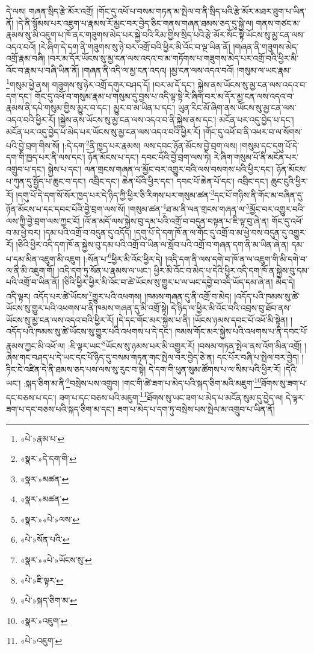 དེ་ལས། གཞན་སྲིད་རྩེ་མོར་འགྲོ། །གོང་དུ་འཕོ་པ་བསམ་གཏན་མ་སྤེལ་བ་ནི་སྲིད་པའི་རྩེ་མོར་མཐར་ཐུག་པ་ཡིན་ནོ། །དེ་ནི་སྙོམས་པར་འཇུག་པ་རྣམས་རོ་མྱང་བར་བྱེད་ཅིང་གནས་གཞན་ཐམས་ཅད་དུ་སྐྱེ་ལ། གནས་གཙང་མ་རྣམས་སུ་མི་འཇུག་པ་ཁོ་ནར་གཟུགས་མེད་པར་སྐྱེ་བའི་རིམ་གྱིས་སྲིད་པའི་རྩེ་མོར་སོང་སྟེ་ཡོངས་སུ་མྱ་ངན་ལས་འདའ་བའོ། །རེ་ཞིག་དེ་དག་ནི་གཟུགས་སུ་ཉེ་བར་འགྲོ་བའི་ཕྱིར་མི་འོང་བ་ལྔ་ཡིན་ནོ། །གཞན་ནི་གཟུགས་མེད་འགྲོ་རྣམ་བཞི། །བར་མ་དོར་ཡོངས་སུ་མྱ་ངན་ལས་འདའ་བ་མ་གཏོགས་པ་གཟུགས་མེད་པར་འགྲོ་བའི་ཕྱིར་མི་འོང་བ་རྣམ་པ་བཞི་ཡིན་ནོ། །གཞན་ནི་འདི་ལ་མྱ་ངན་འདའ། །མྱ་ངན་ལས་འདའ་བའོ། །གསུམ་ལ་ཡང་རྣམ་\footnote{«པེ་»རྣམ་པ་}གསུམ་ཕྱེ་ནས། གཟུགས་སུ་ཉེར་འགྲོ་དགུར་བཤད་དོ། །བར་མ་དོ་དང་། སྐྱེས་ནས་ཡོངས་སུ་མྱ་ངན་ལས་འདའ་བ་དག་དང་། གོང་དུ་འཕོ་བ་གསུམ་རྣམ་པ་གསུམ་དུ་བྱས་པ་འདི་ལྟ་སྟེ་རེ་ཞིག་བར་མ་དོར་མྱ་ངན་ལས་འདའ་བ་རྣམས་ནི་དཔེ་གསུམ་གྱིས་མྱུར་བ་དང་། མྱུར་བ་མ་ཡིན་པ་དང་། ཡུན་རིང་མོ་ཞིག་ནས་ཡོངས་སུ་མྱ་ངན་ལས་འདའ་བའི་ཕྱིར་རོ། །སྐྱེས་ནས་ཡོངས་སུ་མྱ་ངན་ལས་འདའ་བ་ནི་སྐྱེས་ནས་དང་། མངོན་པར་འདུ་བྱེད་པ་དང་། མངོན་པར་འདུ་བྱེད་པ་མེད་པར་ཡོངས་སུ་མྱ་ངན་ལས་འདའ་བའི་ཕྱིར་རོ། །གོང་དུ་འཕོ་བ་ནི་འཕར་བ་ལ་སོགས་པའི་བྱེ་བྲག་གིས་སོ། །:དེ་དག་\footnote{«སྣར་»དེ་དག་གི་}ནི་ཁྱད་པར་རྣམས། ལས་དབང་ཉོན་མོངས་བྱེ་བྲག་ལས། །གསུམ་དང་དགུ་པོ་དེ་དག་གི་ཁྱད་པར་ནི་ལས་དང་། ཉོན་མོངས་པ་དང་། དབང་པོའི་བྱེ་བྲག་ལས་ཏེ། རེ་ཞིག་གསུམ་པོ་ནི་མངོན་པར་འགྲུབ་པ་དང་། སྐྱེས་པ་དང་། ལན་གྲངས་གཞན་ལ་མྱོང་བར་འགྱུར་བའི་ལས་བསགས་པའི་ཕྱིར་དང་། ཉོན་མོངས་པ་ཀུན་དུ་སྤྱོད་པ་ཆུང་བ་དང་། འབྲིང་དང་། ཆེན་པོའི་ཕྱིར་དང་། དབང་པོ་ཆེན་པོ་དང་། འབྲིང་དང་། ཆུང་ངུའི་ཕྱིར་རོ། །དགུ་པོ་དེ་དག་སོ་སོར་ཁྱད་པར་དེ་ཉིད་ཀྱི་ཕྱིར་ཅི་རིགས་པར་གསུམ་ཚན་\footnote{«སྣར་»མཚན་}དང་པོ་གཉིས་ནི་གོང་མ་བཞིན་དུ་ཉོན་མོངས་པ་དང་དབང་པོའི་བྱེ་བྲག་ལས་སོ། །གསུམ་ཚན་\footnote{«སྣར་»མཚན་}ཐ་མ་ནི་ལན་གྲངས་གཞན་ལ་\footnote{«སྣར་»«པེ་»ལས་}མྱོང་བར་འགྱུར་བའི་ལས་ཀྱི་བྱེ་བྲག་ལས་ཀྱང་ངོ། །འོ་ན་མདོ་ལས་སྐྱེས་བུ་དམ་པའི་འགྲོ་བ་བདུན་བསྟན་པ་ཇི་ལྟ་བུ་ཞེ་ན། གོང་དུ་འཕོ་བ་མ་ཕྱེ་བར། །དམ་པའི་འགྲོ་བ་བདུན་དུ་འདོད། །དགུ་པོ་དེ་དག་ཁོ་ན་ལ་གོང་དུ་འགྲོ་བ་མ་ཕྱེ་བས་བདུན་དུ་འགྱུར་རོ། །ཅིའི་ཕྱིར་འདི་དག་ཁོ་ན་སྐྱེས་བུ་དམ་པའི་འགྲོ་བ་ཡིན་ལ་སློབ་པའི་འགྲོ་བ་གཞན་དག་ནི་མ་ཡིན་ཞེ་ན། དམ་པ་དམ་མིན་འཇུག་མི་འཇུག །:སོན་པ་\footnote{«པེ་»སོན་པའི་}ཕྱིར་མི་འོང་ཕྱིར་དེ། །འདི་དག་ནི་ལས་དགེ་བ་ཁོ་ན་ལ་འཇུག་གི་མི་དགེ་བ་ལ་ནི་མི་འཇུག་གོ། །འདི་དག་ཏུ་སོན་པ་རྣམས་ལ་ཡང་། ཕྱིར་མི་འོང་བ་མེད་པ་དེའི་ཕྱིར་འདི་དག་ཁོ་ན་སྐྱེས་བུ་དམ་པའི་འགྲོ་བ་ཡིན་ནོ། །ཅིའི་ཕྱིར་ཕྱིར་མི་འོང་བ་ཚེ་ཡོངས་སུ་གྱུར་པ་ལ་ཡང་དབྱེ་བ་འདི་ཡོད་དམ་ཞེ་ན། མེད་དེ། འདི་ལྟར། འདོད་པར་ཚེ་ཡོངས་\footnote{«སྣར་»«པེ་»ཡོངས་སུ་}གྱུར་པའི་འཕགས། །ཁམས་གཞན་དུ་ནི་འགྲོ་བ་མེད། །འདོད་པའི་ཁམས་སུ་ཚེ་ཡོངས་སུ་གྱུར་པའི་འཕགས་པ་ནི་ཁམས་གཞན་དུ་མི་འགྲོ་སྟེ། དེ་ཉིད་ལ་ཕྱིར་མི་འོང་བའི་འབྲས་བུ་ཐོབ་ནས་ཡོངས་སུ་མྱ་ངན་ལས་འདའ་བའི་ཕྱིར་རོ། །དེ་དང་གོང་མར་སྐྱེས་པ་ནི། །ཡོངས་ཉམས་དབང་པོ་འཕོ་མི་སྟེན། །འདོད་པའི་ཁམས་སུ་ཚེ་ཡོངས་སུ་གྱུར་པའི་འཕགས་པ་དེ་དང་། ཁམས་གོང་མར་སྐྱེས་པའི་འཕགས་པ་ནི་དབང་པོ་རྣམས་ཀྱང་མི་འཕོ་ལ། :ཇི་ལྟར་ཡང་\footnote{«པེ་»ཇི་ལྟར་}ཡོངས་སུ་ཉམས་པར་མི་འགྱུར་རོ། །བསམ་གཏན་སྤེལ་ནས་འོག་མིན་འགྲོ། །ཞེས་གང་བཤད་པ་དེ་ཡང་དང་པོ་ཉིད་དུ་བསམ་གཏན་གང་སྤེལ་བར་བྱེད་ཅེ་ན། དང་པོར་བཞི་པ་སྤེལ་བར་བྱེད། །ཏིང་ངེ་འཛིན་དེ་ནི་ཐམས་ཅད་པས་ལས་སུ་རུང་བ་སྟེ། དེ་དག་གི་ཕུན་སུམ་ཚོགས་པ་ལ་སིམ་པའི་ཕྱིར་རོ། །དེའི་ཡང་། :སྐད་ཅིག་མ་ནི་\footnote{«པེ་»སྐད་ཅིག་མ་}བསྲེས་པས་འགྲུབ། །གང་གི་ཚེ་ཟག་པ་མེད་པའི་སྐད་ཅིག་མའི་མཇུག་\footnote{«སྣར་»འཇུག་}ཐོགས་སུ་ཟག་པ་དང་བཅས་པ་དང་། ཟག་པ་དང་བཅས་པའི་མཇུག་\footnote{«པེ་»འཇུག་}ཐོགས་སུ་ཡང་ཟག་པ་མེད་པ་མངོན་སུམ་དུ་བྱེད་ལ། དེ་ལྟར་ཟག་པ་དང་བཅས་པའི་སྐད་ཅིག་མ་དང་། ཟག་པ་མེད་པ་དག་ཏུ་བསྲེས་པས་སྤེལ་མ་འགྲུབ་པ་ཡིན་ནོ། 